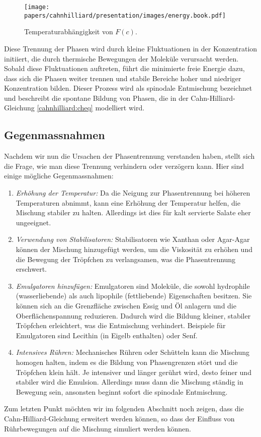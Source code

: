 \begin{figure}
\centering
\texttt{[image: papers/cahnhilliard/presentation/images/energy.book.pdf]}
\caption{Temperaturabhängigkeit von $F(c)$.}
\label{cahnhilliard:fig:fc}
\end{figure}

Diese Trennung der Phasen wird durch kleine Fluktuationen in der Konzentration initiiert,
die durch thermische Bewegungen der Moleküle verursacht werden.
Sobald diese Fluktuationen auftreten,
führt die minimierte freie Energie dazu,
dass sich die Phasen weiter trennen und stabile Bereiche hoher
und niedriger Konzentration bilden.
Dieser Prozess wird als spinodale Entmischung bezeichnet
und beschreibt die spontane Bildung von Phasen,
die in der Cahn-Hilliard-Gleichung \eqref{cahnhilliard:cheq} modelliert wird.

\subsection{Gegenmassnahmen}
Nachdem wir nun die Ursachen der Phasentrennung verstanden haben,
stellt sich die Frage,
wie man diese Trennung verhindern oder verzögern kann.
Hier sind einige mögliche Gegenmassnahmen:
\begin{enumerate}
\item \emph{Erhöhung der Temperatur:}
Da die Neigung zur Phasentrennung bei höheren Temperaturen abnimmt,
kann eine Erhöhung der Temperatur helfen,
die Mischung stabiler zu halten.
Allerdings ist dies für kalt servierte Salate eher ungeeignet.
\item \emph{Verwendung von Stabilisatoren:}
%
%
%
Stabilisatoren wie Xanthan oder Agar-Agar können der Mischung hinzugefügt werden,
um die Viskosität zu erhöhen und die Bewegung der Tröpfchen zu verlangsamen,
was die Phasentrennung erschwert.
\item \emph{Emulgatoren hinzufügen:}
%
Emulgatoren sind Moleküle,
die sowohl hydrophile (wasserliebende)
als auch lipophile (fettliebende) Eigenschaften besitzen.
Sie können sich an die Grenzfläche zwischen Essig und Öl anlagern
und die Oberflächenspannung reduzieren.
Dadurch wird die Bildung kleiner,
stabiler Tröpfchen erleichtert,
was die Entmischung verhindert.
Beispiele für Emulgatoren sind Lecithin (in Eigelb enthalten) oder Senf.
%
%
\item \emph{Intensives Rühren:}
Mechanisches Rühren oder Schütteln kann die Mischung homogen halten,
%
indem es die Bildung von Phasengrenzen stört und die Tröpfchen klein hält.
Je intensiver und länger gerührt wird,
desto feiner und stabiler wird die Emulsion.
Allerdings muss dann die Mischung ständig in Bewegung sein,
ansonsten beginnt sofort die spinodale Entmischung.
\end{enumerate}
Zum letzten Punkt möchten wir im folgenden Abschnitt noch zeigen,
dass die Cahn-Hilliard-Gleichung erweitert werden können,
so dass der Einfluss von Rührbewegungen auf die Mischung simuliert werden können.

